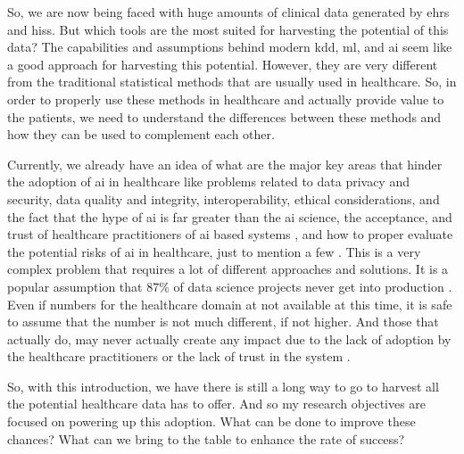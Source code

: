 So, we are now being faced with huge amounts of clinical data generated by \acp{ehr} and \acp{his}. But which tools are the most suited for harvesting the potential of this data? 
The capabilities and assumptions behind modern \ac{kdd}, \ac{ml}, and \ac{ai} seem like a good approach for harvesting this potential. However, they are very different from the traditional statistical methods that are usually used in healthcare.
So, in order to properly use these methods in healthcare and actually provide value to the patients, we need to understand the differences between these methods and how they can be used to complement each other.

Currently, we already have an idea of what are the major key areas that hinder the adoption of \ac{ai} in healthcare like problems related to data privacy and security, data quality and integrity, interoperability, ethical considerations, and the fact that the hype of \ac{ai} is far greater than the \ac{ai} science, the acceptance, and trust of healthcare practitioners of \ac{ai} based systems \cite{muhiyaddinImpactClinicalDecision2020,kilsdonkFactorsInfluencingImplementation2017}, and how to proper evaluate the potential risks of \ac{ai} in healthcare, just to mention a few \cite{topolHighperformanceMedicineConvergence2019a}.
This is a very complex problem that requires a lot of different approaches and solutions. It is a popular assumption that 87\% of data science projects never get into production \cite{Why87Data2019}. Even if numbers for the healthcare domain at not available at this time, it is safe to assume that the number is not much different, if not higher. And those that actually do, may never actually create any impact due to the lack of adoption by the healthcare practitioners or the lack of trust in the system \cite{walkerModelGuidedDecisionMakingThromboprophylaxis2023}.

So, with this introduction, we have there is still a long way to go to harvest all the potential healthcare data has to offer. And so my research objectives are focused on powering up this adoption. What can be done to improve these chances? What can we bring to the table to enhance the rate of success?






